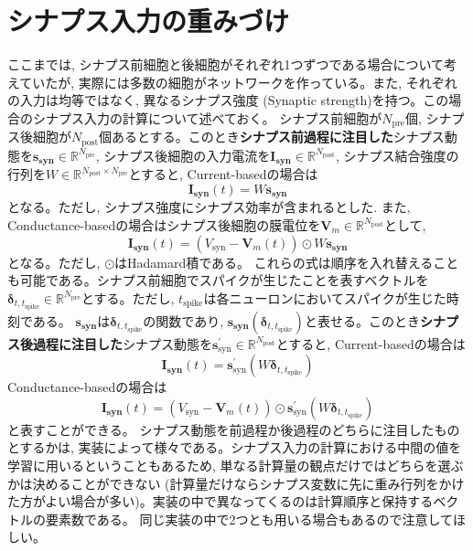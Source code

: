 \section{シナプス入力の重みづけ}
ここまでは, シナプス前細胞と後細胞がそれぞれ1つずつである場合について考えていたが, 実際には多数の細胞がネットワークを作っている。また, それぞれの入力は均等ではなく, 異なるシナプス強度 (Synaptic strength)を持つ。この場合のシナプス入力の計算について述べておく。
シナプス前細胞が$N_{\text{pre}}$個, シナプス後細胞が$N_{\text{post}}$個あるとする。このとき\textbf{シナプス前過程に注目した}シナプス動態を$\boldsymbol{s_{\text{syn}}}\in \mathbb{R}^{N_{\text{pre}}}$, シナプス後細胞の入力電流を$\boldsymbol{I_{\text{syn}}}\in \mathbb{R}^{N_{\text{post}}}$, シナプス結合強度の行列を$W\in \mathbb{R}^{N_{\text{post}} \times N_{\text{pre}}}$とすると, Current-basedの場合は
\begin{equation}
\boldsymbol{I_{\text{syn}}}(t)=W \boldsymbol{s_{\text{syn}}}  
\end{equation}
となる。ただし, シナプス強度にシナプス効率が含まれるとした. また, Conductance-basedの場合はシナプス後細胞の膜電位を$\boldsymbol{V}_{m}\in \mathbb{R}^{N_{\text{post}}}$として, 
\begin{equation}
\boldsymbol{I_{\text{syn}}}(t)=\left(V_{\text{syn}}-\boldsymbol{V}_{m}(t)\right)\odot W \boldsymbol{s_{\text{syn}}}
\end{equation}
となる。ただし, $\odot$はHadamard積である。
これらの式は順序を入れ替えることも可能である。シナプス前細胞でスパイクが生じたことを表すベクトルを$\boldsymbol{\delta}_{t,t_{\text{spike}}}\in \mathbb{R}^{N_{\text{pre}}}$とする。ただし, $t_{\text{spike}}$は各ニューロンにおいてスパイクが生じた時刻である。 $\boldsymbol{s_{\text{syn}}}$は$\boldsymbol{\delta}_{t,t_{\text{spike}}}$の関数であり, $\boldsymbol{s_{\text{syn}}}(\boldsymbol{\delta}_{t,t_{\text{spike}}})$と表せる。このとき\textbf{シナプス後過程に注目した}シナプス動態を$\boldsymbol{s}^\prime_{\text{syn}}\in \mathbb{R}^{N_{\text{post}}}$とすると, Current-basedの場合は
\begin{equation}
\boldsymbol{I_{\text{syn}}}(t)=\boldsymbol{s}^\prime_{\text{syn}}(W\boldsymbol{\delta}_{t,t_{\text{spike}}})  
\end{equation}
Conductance-basedの場合は
\begin{equation}
\boldsymbol{I_{\text{syn}}}(t)=\left(V_{\text{syn}}-\boldsymbol{V}_{m}(t)\right)\odot \boldsymbol{s}^\prime_{\text{syn}}(W\boldsymbol{\delta}_{t,t_{\text{spike}}})
\end{equation}
と表すことができる。
シナプス動態を前過程か後過程のどちらに注目したものとするかは, 実装によって様々である。シナプス入力の計算における中間の値を学習に用いるということもあるため, 単なる計算量の観点だけではどちらを選ぶかは決めることができない (計算量だけならシナプス変数に先に重み行列をかけた方がよい場合が多い)。実装の中で異なってくるのは計算順序と保持するベクトルの要素数である。 同じ実装の中で2つとも用いる場合もあるので注意してほしい。
